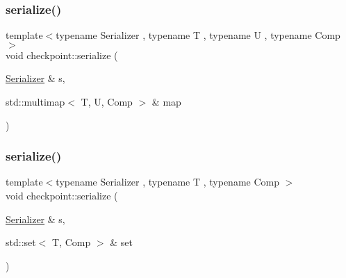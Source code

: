 \mbox{\label{namespacecheckpoint_a44434f578fc304afa3a62a9305be2a65}} 
\subsubsection{\texorpdfstring{serialize()}{serialize()}\hspace{0.1cm}{\footnotesize\ttfamily [17/29]}}
{\footnotesize\ttfamily template$<$typename Serializer , typename T , typename U , typename Comp $>$ \\
void checkpoint\+::serialize (\begin{DoxyParamCaption}\item[{\hyperlink{structcheckpoint_1_1_serializer}{Serializer} \&}]{s,  }\item[{std\+::multimap$<$ T, U, Comp $>$ \&}]{map }\end{DoxyParamCaption})\hspace{0.3cm}{\ttfamily [inline]}}

\mbox{\label{namespacecheckpoint_a9f1869781f4cce4db94c144174680b24}} 
\subsubsection{\texorpdfstring{serialize()}{serialize()}\hspace{0.1cm}{\footnotesize\ttfamily [18/29]}}
{\footnotesize\ttfamily template$<$typename Serializer , typename T , typename Comp $>$ \\
void checkpoint\+::serialize (\begin{DoxyParamCaption}\item[{\hyperlink{structcheckpoint_1_1_serializer}{Serializer} \&}]{s,  }\item[{std\+::set$<$ T, Comp $>$ \&}]{set }\end{DoxyParamCaption})\hspace{0.3cm}{\ttfamily [inline]}}

\mbox{\label{namespacecheckpoint_ae9a809c203a65d06dbd99acc82be4844}} 
